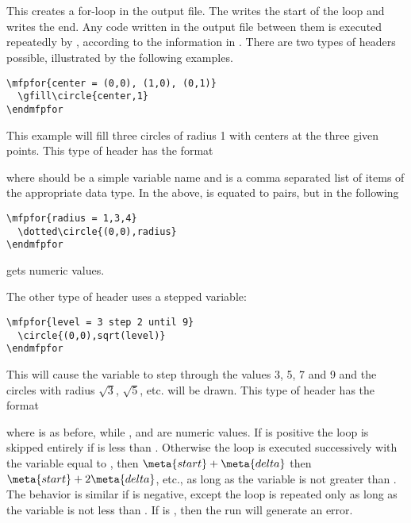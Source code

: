 \documentclass[letterpaper]{article}
\begin{document}
\begin{cd}
\\
 \ \\
%
%
\end{cd}

This creates a for-loop in the \MF{} output file. The  writes
the start of the loop and  writes the end. Any code
written in the output file between them is executed repeatedly by
\MF{}, according to the information in . There are
two types of headers possible, illustrated by the following examples.
\begin{verbatim}
\mfpfor{center = (0,0), (1,0), (0,1)}
  \gfill\circle{center,1}
\endmfpfor
\end{verbatim}
This example will fill three circles of radius 1 with centers at the
three given points. This type of header has the format
\begin{display}
\end{display}
where  should be a simple variable name and 
is a comma separated list of items of the appropriate data type. In the
above,  is equated to pairs, but in the following
\begin{verbatim}
\mfpfor{radius = 1,3,4}
  \dotted\circle{(0,0),radius}
\endmfpfor
\end{verbatim}
 gets numeric values.

The other type of header uses a stepped variable:
\begin{verbatim}
\mfpfor{level = 3 step 2 until 9}
  \circle{(0,0),sqrt(level)}
\endmfpfor
\end{verbatim}
This will cause the \MF{} variable  to step through the
values 3, 5, 7 and 9 and the circles with radius $\sqrt{3}$, $\sqrt{5}$,
etc. will be drawn. This type of header has the format
\begin{display}
\end{display}
where  is as before, while ,  and
 are numeric values. If  is positive the loop is
skipped entirely if  is less than . Otherwise the
loop is executed successively with the variable equal to ,
then $\meta{start} + \meta{delta}$ then $\meta{start} + 2\meta{delta}$,
etc., as long as the variable is not greater than . The
behavior is similar if  is negative, except the loop is
repeated only as long as the variable is not less than . If
 is , then the \MF{} run will generate an error.
\end{document}
